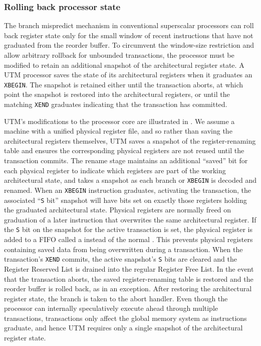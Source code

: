 \subsubsection{Rolling back processor state}

The branch mispredict mechanism in conventional superscalar processors
can roll back register state only for the small window of recent
instructions that have not graduated from the reorder buffer.  To
circumvent the window-size restriction and allow arbitrary rollback
for unbounded transactions, the processor must be modified to retain
an additional snapshot of the architectural register state.  A UTM
processor saves the state of its architectural registers when it
graduates an \texttt{XBEGIN}\@.  The snapshot is retained either until
the transaction aborts, at which point the snapshot is restored into
the architectural registers, or until the matching \texttt{XEND}
graduates indicating that the transaction has committed.

UTM's modifications to the processor core are illustrated in
.  We assume a machine with a unified physical
register file, and so rather than saving the architectural registers
themselves, UTM saves a snapshot of the register-renaming table
and ensures the corresponding physical registers are not reused until
the transaction commits.
The rename stage maintains an additional ``saved'' bit
for each physical register 
to indicate which registers are part of the working
architectural state, and takes a snapshot as
each branch or \texttt{XBEGIN} is decoded and renamed.
When an \texttt{XBEGIN} instruction
graduates, activating the transaction, the associated ``\texttt{S} bit''
snapshot will have bits set
on exactly those registers holding the graduated architectural state.  Physical
registers are normally freed on graduation of a later instruction that
overwrites the same architectural register.  If the \texttt{S} bit on
the snapshot for the active transaction is
set, the physical register is added to a FIFO called a  instead of the normal .  This
prevents physical registers containing saved data from being
overwritten during a transaction.  When the
transaction's \texttt{XEND} commits, the active snapshot's \texttt{S}
bits are cleared and the Register
Reserved List is drained into the regular Register Free List.  In the
event that the transaction aborts, the saved register-renaming table
is restored and the reorder buffer is rolled back, as in an exception.
After restoring the architectural register state, the branch is taken
to the abort handler.  Even though the processor can internally
speculatively execute ahead through multiple transactions,
transactions only affect the global memory system as instructions
graduate, and hence UTM requires only a single snapshot of the
architectural register state.


